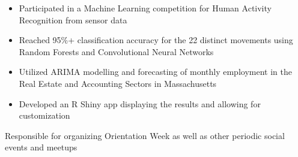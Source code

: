 
\begin{itemize}
    \item Participated in a Machine Learning competition for Human Activity Recognition from sensor data
    \item Reached 95\%+ classification accuracy for the 22 distinct movements using Random Forests and Convolutional Neural Networks
\end{itemize}

\divider

\begin{itemize}
    \item Utilized ARIMA modelling and forecasting of monthly employment in the Real Estate and Accounting Sectors in Massachusetts
    \item Developed an R Shiny app displaying the results and allowing for customization
\end{itemize}






Responsible for organizing Orientation Week as well as other periodic social events and meetups

\divider

